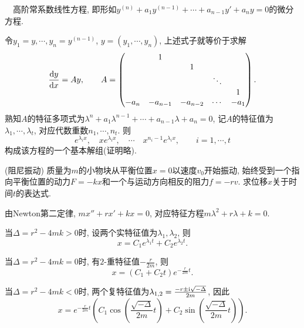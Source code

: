 ~~高阶常系数线性方程, 即形如$y^{(n)}+a_1y^{(n-1)} + \cdots + a_{n-1}y'+a_ny=0$的微分方程. 

令$y_1=y,\cdots ,y_n=y^{(n-1)}$, $y=(y_1,\cdots ,y_n)$, 上述式子就等价于求解$$\frac{\mathop{}\!\mathrm{d} y}{\mathop{}\!\mathrm{d} x} = Ay,\qquad A=\begin{pmatrix}
  & 1 &  &  &   \\
  &  & 1 &  &   \\
  &  &  & \ddots    & \\
  &  &  &    & 1\\
 -a_n & -a_{n-1} & -a_{n-2} & \cdots  & -a_1
\end{pmatrix}.$$
熟知$A$的特征多项式为$\lambda ^n+a_1\lambda ^{n-1} + \cdots + a_{n-1}\lambda +a_n=0$, 记$A$的特征值为$\lambda _1,\cdots ,\lambda _t$, 对应代数重数$n_1,\cdots ,n_t$. 则$$e^{\lambda _ix},\quad xe^{\lambda _ix}, \quad \cdots \quad x^{n_i-1}e^{\lambda _ix},\qquad i=1,\cdots ,t$$
构成该方程的一个基本解组(证明略). 

\begin{example}
	(阻尼振动) 质量为$m$的小物块从平衡位置$x=0$以速度$v_0$开始振动, 始终受到一个指向平衡位置的动力$F=-kx$和一个与运动方向相反的阻力$f=-r v$. 求位移$x$关于时间$t$的表达式. 
\end{example}
\begin{solution}
	由Newton第二定律, $mx''+rx'+kx=0$, 对应特征方程$m\lambda ^2+r\lambda +k=0$. 
	
	当$\Delta = r^2-4mk>0$时, 设两个实特征值为$\lambda _1,\lambda _2$, 则$$x=C_1e^{\lambda _1t}+C_2e^{\lambda _2t}.$$
	
	当$\Delta = r^2-4mk=0$时, 有$2$-重特征值$-\frac{r}{2m}$, 则$$x=(C_1+C_2t)e^{-\frac{r}{2m}t}.$$
	
	当$\Delta = r^2-4mk<0$时, 两个复特征值为$\lambda_{1,2}=\frac{-r\pm \mathrm{i} \sqrt{-\Delta}}{2m}$, 因此$$x=e^{-\frac{r}{2m}t}\left( C_1\cos \left( \frac{\sqrt{-\Delta}}{2m}t \right)+C_2\sin \left( \frac{\sqrt{-\Delta}}{2m}t \right) \right).$$
\end{solution}
















